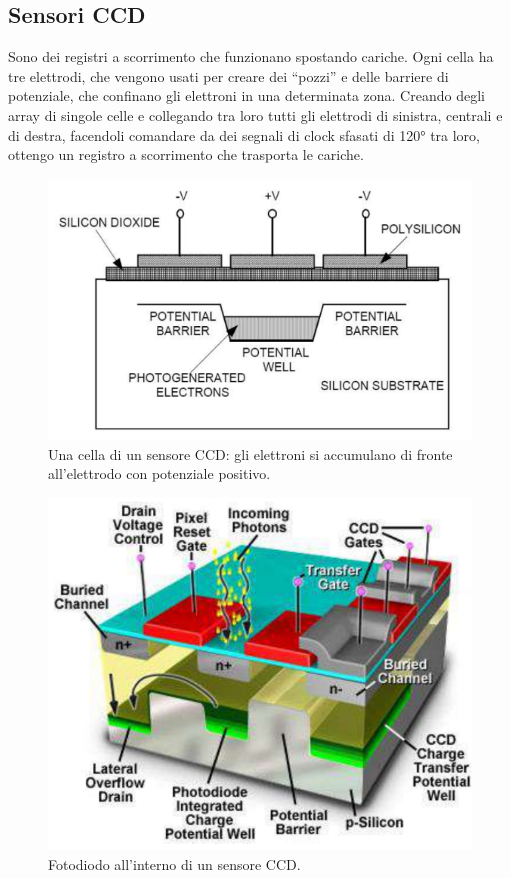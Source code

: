 \documentclass[a4paper,11pt]{article}
\begin{document}
\subsection{Sensori CCD}
Sono dei registri a scorrimento che funzionano spostando cariche.
Ogni cella ha tre elettrodi, che vengono usati per creare dei ``pozzi'' e delle barriere di potenziale,
che confinano gli elettroni in una determinata zona. Creando degli array di singole celle e collegando tra loro tutti
gli elettrodi di sinistra, centrali e di destra, facendoli comandare da dei segnali di clock sfasati di 120° tra loro,
ottengo un registro a scorrimento che trasporta le cariche.

\renewcommand{\thefigure}{3.9}
\begin{figure}[!h]
  \centering
    \includegraphics[scale=0.5]{images/3/ccd_cell.png}
    \caption{Una cella di un sensore CCD: gli elettroni si accumulano di fronte all'elettrodo con potenziale positivo.}
\end{figure}

\renewcommand{\thefigure}{3.10}
\begin{figure}[!h]
  \centering
    \includegraphics[scale=0.5]{images/3/photodiode_ccd.png}
    \caption{Fotodiodo all'interno di un sensore CCD.}
\end{figure}
\end{document}
